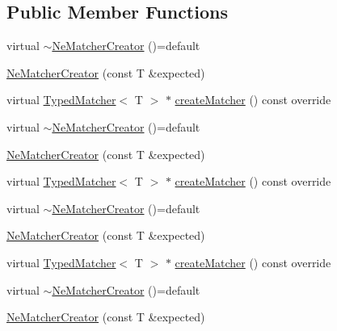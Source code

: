 \subsection*{Public Member Functions}
\begin{DoxyCompactItemize}
\item 
virtual \mbox{\hyperlink{structfakeit_1_1internal_1_1NeMatcherCreator_a8a1d7213f8e7611867a812de3e4310a9}{$\sim$\+Ne\+Matcher\+Creator}} ()=default
\item 
\mbox{\hyperlink{structfakeit_1_1internal_1_1NeMatcherCreator_a15ad0bf386a46786631d4f46b730e646}{Ne\+Matcher\+Creator}} (const T \&expected)
\item 
virtual \mbox{\hyperlink{structfakeit_1_1TypedMatcher}{Typed\+Matcher}}$<$ T $>$ $\ast$ \mbox{\hyperlink{structfakeit_1_1internal_1_1NeMatcherCreator_a5207ab2452c0d075a629b828115716cb}{create\+Matcher}} () const override
\item 
virtual \mbox{\hyperlink{structfakeit_1_1internal_1_1NeMatcherCreator_a8a1d7213f8e7611867a812de3e4310a9}{$\sim$\+Ne\+Matcher\+Creator}} ()=default
\item 
\mbox{\hyperlink{structfakeit_1_1internal_1_1NeMatcherCreator_a15ad0bf386a46786631d4f46b730e646}{Ne\+Matcher\+Creator}} (const T \&expected)
\item 
virtual \mbox{\hyperlink{structfakeit_1_1TypedMatcher}{Typed\+Matcher}}$<$ T $>$ $\ast$ \mbox{\hyperlink{structfakeit_1_1internal_1_1NeMatcherCreator_a5207ab2452c0d075a629b828115716cb}{create\+Matcher}} () const override
\item 
virtual \mbox{\hyperlink{structfakeit_1_1internal_1_1NeMatcherCreator_a8a1d7213f8e7611867a812de3e4310a9}{$\sim$\+Ne\+Matcher\+Creator}} ()=default
\item 
\mbox{\hyperlink{structfakeit_1_1internal_1_1NeMatcherCreator_a15ad0bf386a46786631d4f46b730e646}{Ne\+Matcher\+Creator}} (const T \&expected)
\item 
virtual \mbox{\hyperlink{structfakeit_1_1TypedMatcher}{Typed\+Matcher}}$<$ T $>$ $\ast$ \mbox{\hyperlink{structfakeit_1_1internal_1_1NeMatcherCreator_a5207ab2452c0d075a629b828115716cb}{create\+Matcher}} () const override
\item 
virtual \mbox{\hyperlink{structfakeit_1_1internal_1_1NeMatcherCreator_a8a1d7213f8e7611867a812de3e4310a9}{$\sim$\+Ne\+Matcher\+Creator}} ()=default
\item 
\mbox{\hyperlink{structfakeit_1_1internal_1_1NeMatcherCreator_a15ad0bf386a46786631d4f46b730e646}{Ne\+Matcher\+Creator}} (const T \&expected)
\item 

\end{DoxyCompactItemize}
